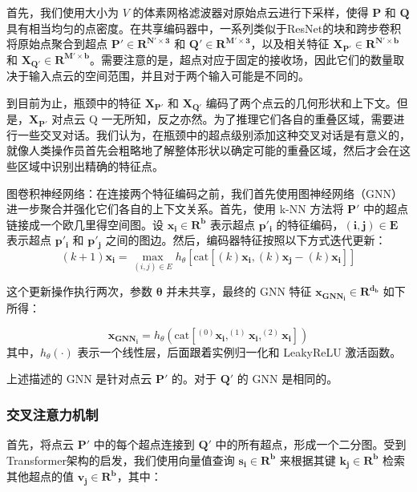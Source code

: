 首先，我们使用大小为 $V$ 的体素网格滤波器对原始点云进行下采样，使得 $\boldsymbol{P}$ 和 $\boldsymbol{Q}$ 具有相当均匀的点密度。在共享编码器中，一系列类似于ResNet的块和跨步卷积将原始点聚合到超点 $\boldsymbol{P' \in R^{N' \times 3}}$ 和 $\boldsymbol{Q' \in R^{M' \times 3}}$，以及相关特征 $\boldsymbol{X_{P'} \in R^{N' \times b}}$ 和 $\boldsymbol{X_{Q'} \in R^{M' \times b}}$。需要注意的是，超点对应于固定的接收场，因此它们的数量取决于输入点云的空间范围，并且对于两个输入可能是不同的。

到目前为止，瓶颈中的特征 $\boldsymbol{X_{P'}}$ 和 $\boldsymbol{X_{Q'}}$ 编码了两个点云的几何形状和上下文。但是，$\boldsymbol{X_{P'}}$ 对点云 Q 一无所知，反之亦然。为了推理它们各自的重叠区域，需要进行一些交叉对话。我们认为，在瓶颈中的超点级别添加这种交叉对话是有意义的，就像人类操作员首先会粗略地了解整体形状以确定可能的重叠区域，然后才会在这些区域中识别出精确的特征点。

图卷积神经网络：在连接两个特征编码之前，我们首先使用图神经网络（GNN）进一步聚合并强化它们各自的上下文关系。首先，使用 k-NN 方法将 $\boldsymbol{P'}$ 中的超点链接成一个欧几里得空间图。设 $\boldsymbol{x_i \in R^b}$ 表示超点 $\boldsymbol{p'_i}$ 的特征编码，$\boldsymbol{(i, j) \in E}$ 表示超点 $\boldsymbol{p'_i}$ 和 $\boldsymbol{p'_j}$ 之间的图边。然后，编码器特征按照以下方式迭代更新：
\begin{equation}
    (k+1)\boldsymbol{x_i} = \max_{(i,j) \in E} h_{\theta} \left[ \text{cat} \left[(k)\boldsymbol{x_i}, (k)\boldsymbol{x_j} - (k)\boldsymbol{x_i} \right] \right]
\end{equation}

这个更新操作执行两次，参数 $\boldsymbol{\theta}$ 并未共享，最终的 GNN 特征 $\boldsymbol{x_{GNN_i} \in R^{d_b}}$ 如下所得：

\begin{equation}
\boldsymbol{x_{GNN_i}} = h_{\theta}(\text{cat}[^{(0)}\boldsymbol{x_i}, ^{(1)}\boldsymbol{x_i}, ^{(2)}\boldsymbol{x_i}])
\end{equation}
其中，$h_{\theta}(·)$ 表示一个线性层，后面跟着实例归一化和 LeakyReLU 激活函数。

上述描述的 GNN 是针对点云 $\boldsymbol{P'}$ 的。对于 $\boldsymbol{Q'}$ 的 GNN 是相同的。

\subsubsection{交叉注意力机制}首先，将点云 $\boldsymbol{P'}$ 中的每个超点连接到 $\boldsymbol{Q'}$ 中的所有超点，形成一个二分图。受到Transformer架构的启发，我们使用向量值查询 $\boldsymbol{s_i \in R^b}$ 来根据其键 $\boldsymbol{k_j \in R^b}$ 检索其他超点的值 $\boldsymbol{v_j \in R^b}$，其中：

